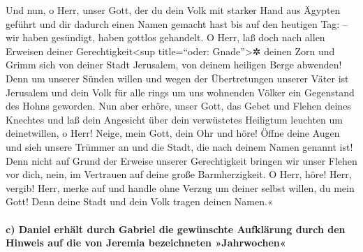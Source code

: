 Und nun, o Herr, unser Gott, der du dein Volk mit starker
Hand aus Ägypten geführt und dir dadurch einen Namen gemacht hast bis
auf den heutigen Tag: -- wir haben gesündigt, haben gottlos gehandelt.
O Herr, laß doch nach allen Erweisen deiner
Gerechtigkeit\textless sup title=``oder: Gnade''\textgreater✲ deinen
Zorn und Grimm sich von deiner Stadt Jerusalem, von deinem heiligen
Berge abwenden! Denn um unserer Sünden willen und wegen der
Übertretungen unserer Väter ist Jerusalem und dein Volk für alle rings
um uns wohnenden Völker ein Gegenstand des Hohns geworden.
Nun aber erhöre, unser Gott, das Gebet und Flehen deines
Knechtes und laß dein Angesicht über dein verwüstetes Heiligtum leuchten
um deinetwillen, o Herr! Neige, mein Gott, dein Ohr und
höre! Öffne deine Augen und sieh unsere Trümmer an und die Stadt, die
nach deinem Namen genannt ist! Denn nicht auf Grund der Erweise unserer
Gerechtigkeit bringen wir unser Flehen vor dich, nein, im Vertrauen auf
deine große Barmherzigkeit. O Herr, höre! Herr, vergib!
Herr, merke auf und handle ohne Verzug um deiner selbst willen, du mein
Gott! Denn deine Stadt und dein Volk tragen deinen Namen.«

\hypertarget{c-daniel-erhuxe4lt-durch-gabriel-die-gewuxfcnschte-aufkluxe4rung-durch-den-hinweis-auf-die-von-jeremia-bezeichneten-jahrwochen}{%
\paragraph{c) Daniel erhält durch Gabriel die gewünschte Aufklärung
durch den Hinweis auf die von Jeremia bezeichneten
»Jahrwochen«}\label{c-daniel-erhuxe4lt-durch-gabriel-die-gewuxfcnschte-aufkluxe4rung-durch-den-hinweis-auf-die-von-jeremia-bezeichneten-jahrwochen}}

